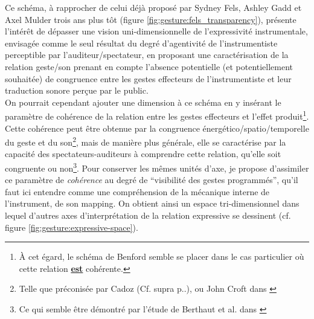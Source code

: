 \noindent Ce schéma, à rapprocher de celui déjà proposé par Sydney Fels, Ashley Gadd et Axel Mulder trois ans plus tôt (figure \ref{fig:gesture:fels_transparency}), présente l'intérêt de dépasser une vision uni-dimensionnelle de l'expressivité instrumentale, envisagée comme le seul résultat du degré d'agentivité de l'instrumentiste perceptible par l'auditeur/spectateur, en proposant une caractérisation de la relation geste/son prenant en compte l'absence potentielle (et potentiellement souhaitée) de congruence entre les gestes effecteurs de l'instrumentiste et leur traduction sonore perçue par le public.\\
\indent On pourrait cependant ajouter une dimension à ce schéma en y insérant le paramètre de cohérence de la relation entre les gestes effecteurs et l'effet produit\footnote{À cet égard, le schéma de Benford semble se placer dans le cas particulier où cette relation  \underline{\textbf{est}} cohérente.}. Cette cohérence peut être obtenue par la congruence énergético/spatio/temporelle du geste et du son\footnote{Telle que préconisée par Cadoz (Cf. supra p.\pageref{sec:gesture:ergotic}.), ou John Croft dans \cite{croft_theses_2007}}, mais de manière plus générale, elle se caractérise par la capacité des spectateurs-auditeurs à comprendre cette relation, qu'elle soit congruente ou non\footnote{Ce qui semble être démontré par l'étude de Berthaut et al. dans \cite{berthaut_rouages:_2013}}. Pour conserver les mêmes unités d'axe, je propose d'assimiler ce paramètre de \textit{cohérence} au degré de ``visibilité des gestes programmés'', qu'il faut ici entendre comme une compréhension de la mécanique interne de l'instrument, de son mapping. On obtient ainsi un espace tri-dimensionnel dans lequel d'autres axes d'interprétation de la relation expressive se dessinent (cf. figure \ref{fig:gesture:expressive-space}).\\
